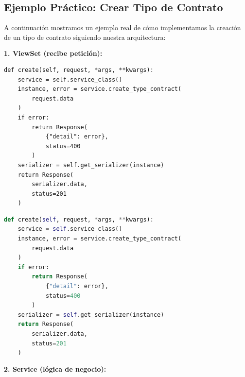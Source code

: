 \subsection{Ejemplo Práctico: Crear Tipo de Contrato}

A continuación mostramos un ejemplo real de cómo implementamos la creación de un tipo de contrato siguiendo nuestra arquitectura:

\textbf{1. ViewSet (recibe petición):}

\ifminted
\begin{verbatim}
def create(self, request, *args, **kwargs):
    service = self.service_class()
    instance, error = service.create_type_contract(
        request.data
    )
    if error:
        return Response(
            {"detail": error}, 
            status=400
        )
    serializer = self.get_serializer(instance)
    return Response(
        serializer.data, 
        status=201
    )
\end{verbatim}
\else
\begin{lstlisting}[language=Python,basicstyle=\small]
def create(self, request, *args, **kwargs):
    service = self.service_class()
    instance, error = service.create_type_contract(
        request.data
    )
    if error:
        return Response(
            {"detail": error}, 
            status=400
        )
    serializer = self.get_serializer(instance)
    return Response(
        serializer.data, 
        status=201
    )
\end{lstlisting}
\fi

\textbf{2. Service (lógica de negocio):}

